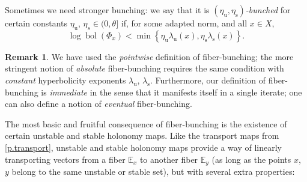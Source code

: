 \documentclass[10pt]{amsart}
\theoremstyle{plain}
\theoremstyle{definition}
\newtheorem{remark}[theorem]{Remark}
\newcommand{\EE}{\mathbb{E}}
\newcommand{\uu}{\mathrm{u}}
\renewcommand{\ss}{\mathrm{s}}
\DeclareMathOperator{\bol}{bol}
\begin{document}
Sometimes we need stronger bunching: we say that it is \emph{$(\eta_\uu,\eta_\ss)$-bunched} for certain constants $\eta_\uu$, $\eta_s \in (0,\theta]$ if, for some adapted norm, and all $x\in X$,
\begin{equation}\label{e.def_strongly_bunched}
\log \bol(\Phi_x)
< \min \left\{ \eta_\uu \lambda_\uu(x), \eta_\ss \lambda_\ss(x)\right\}.
\end{equation}

\begin{remark}\label{r.pointwise_vs_absolute}
We have used the \emph{pointwise} definition of fiber-bunching;
the more stringent notion of \emph{absolute} fiber-bunching requires the same condition
with \emph{constant} hyperbolicity exponents $\lambda_\uu$, $\lambda_\ss$.
Furthermore, our definition of fiber-bunching is \emph{immediate} in the sense that it manifests itself in a single iterate; one can also define a notion of \emph{eventual} fiber-bunching.
\end{remark}

The most basic and fruitful consequence of fiber-bunching is the existence of certain unstable and stable holonomy maps.
Like the transport maps from \cref{p.transport}, unstable and stable holonomy maps provide a way of linearly transporting vectors from a fiber $\EE_x$ to another fiber $\EE_y$ (as long as the points $x$, $y$ belong to the same unstable or stable set), but with several extra properties:
\end{document}
